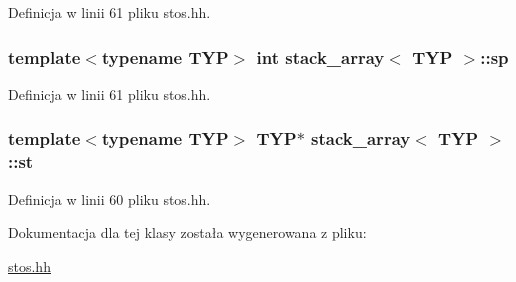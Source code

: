 \-Definicja w linii 61 pliku stos.\-hh.

\hypertarget{classstack__array_a598f4974aca293a20a809788ffe80b15}{
\subsubsection[{sp}]{\setlength{\rightskip}{0pt plus 5cm}template$<$typename \-T\-Y\-P$>$ int {\bf stack\-\_\-array}$<$ \-T\-Y\-P $>$\-::{\bf sp}}}\label{classstack__array_a598f4974aca293a20a809788ffe80b15}


\-Definicja w linii 61 pliku stos.\-hh.

\hypertarget{classstack__array_aa97b399041c2d08b3955bb6436cbcf2f}{
\subsubsection[{st}]{\setlength{\rightskip}{0pt plus 5cm}template$<$typename \-T\-Y\-P$>$ \-T\-Y\-P$\ast$ {\bf stack\-\_\-array}$<$ \-T\-Y\-P $>$\-::{\bf st}}}\label{classstack__array_aa97b399041c2d08b3955bb6436cbcf2f}


\-Definicja w linii 60 pliku stos.\-hh.



\-Dokumentacja dla tej klasy została wygenerowana z pliku\-:\begin{DoxyCompactItemize}
\item 
\hyperlink{stos_8hh}{stos.\-hh}\end{DoxyCompactItemize}
